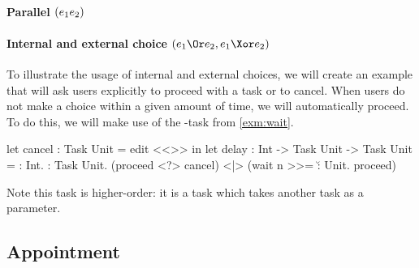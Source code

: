 \paragraph{Parallel $(e_1 \relax e_2)$}




\paragraph{Internal and external choice $(e_1 \Or e_2, e_1 \Xor e_2)$}


\begin{example}[Delay]


To illustrate the usage of internal and external choices,
we will create an example that will ask users explicitly to proceed with a task or to cancel.
When users do not make a choice within a given amount of time,
we will automatically proceed.
To do this,
we will make use of the -task from \cref{exm:wait}.
\begin{TASK}
  let cancel : Task Unit = edit <<>> in
  let delay : Int -> Task Unit -> Task Unit =
    \n : Int. \proceed : Task Unit.
    (proceed <?> cancel) <|> (wait n >>= \u : Unit. proceed)
\end{TASK}
Note this task is higher-order:
it is a task which takes another task as a parameter.

\end{example}

\subsection{Appointment}


%
%
%
%
%
